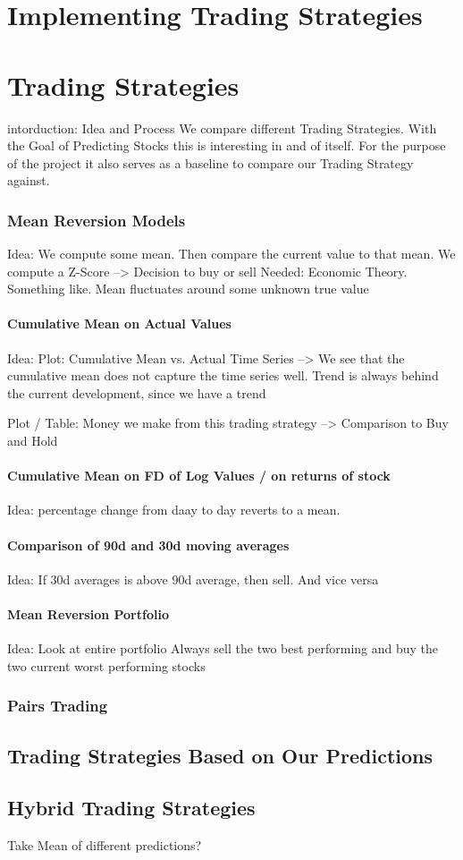 \chapter{Implementing Trading Strategies}\label{ch:predictions}


\chapter{Trading Strategies}
intorduction: Idea and Process
We compare different Trading Strategies. With the Goal of Predicting Stocks this is interesting in and of itself. For the purpose of the project it also serves as a baseline to compare our Trading Strategy against. 



\subsection{Mean Reversion Models}
Idea: We compute some mean. Then compare the current value to that mean. We compute a Z-Score --> Decision to buy or sell
Needed: Economic Theory. Something like. Mean fluctuates around some unknown true value

\subsubsection{Cumulative Mean on Actual Values}
Idea: 
Plot: Cumulative Mean vs. Actual Time Series
--> We see that the cumulative mean does not capture the time series well. Trend is always behind the current development, since we have a trend

Plot / Table: Money we make from this trading strategy --> Comparison to Buy and Hold

\subsubsection{Cumulative Mean on FD of Log Values / on returns of stock}
Idea: percentage change from daay to day reverts to a mean. 


\subsubsection{Comparison of 90d and 30d moving averages}
Idea: If 30d averages is above 90d average, then sell. And vice versa

\subsubsection{Mean Reversion Portfolio}
Idea: Look at entire portfolio
Always sell the two best performing and buy the two current worst performing stocks


\subsection{Pairs Trading}



\section{Trading Strategies Based on Our Predictions}



\section{Hybrid Trading Strategies}
Take Mean of different predictions?



